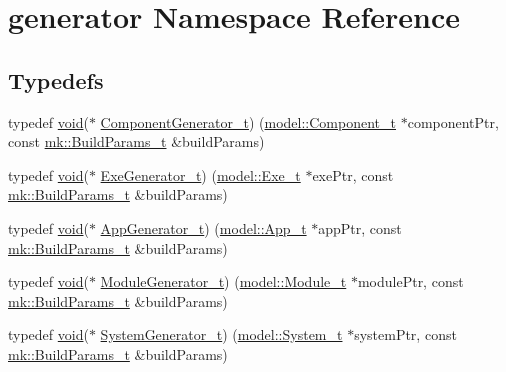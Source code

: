 \hypertarget{namespacegenerator}{}\section{generator Namespace Reference}
\label{namespacegenerator}
\subsection*{Typedefs}
\begin{DoxyCompactItemize}
\item 
typedef \hyperlink{_t_e_m_p_l_a_t_e__cdef_8h_ac9c84fa68bbad002983e35ce3663c686}{void}($\ast$ \hyperlink{namespacegenerator_a51a9c405b080b56f182d2a9324a9325d}{Component\+Generator\+\_\+t}) (\hyperlink{structmodel_1_1_component__t}{model\+::\+Component\+\_\+t} $\ast$component\+Ptr, const \hyperlink{structmk_1_1_build_params__t}{mk\+::\+Build\+Params\+\_\+t} \&build\+Params)
\item 
typedef \hyperlink{_t_e_m_p_l_a_t_e__cdef_8h_ac9c84fa68bbad002983e35ce3663c686}{void}($\ast$ \hyperlink{namespacegenerator_a8cae660bbcd34ce61bd0d4e2d526dac0}{Exe\+Generator\+\_\+t}) (\hyperlink{structmodel_1_1_exe__t}{model\+::\+Exe\+\_\+t} $\ast$exe\+Ptr, const \hyperlink{structmk_1_1_build_params__t}{mk\+::\+Build\+Params\+\_\+t} \&build\+Params)
\item 
typedef \hyperlink{_t_e_m_p_l_a_t_e__cdef_8h_ac9c84fa68bbad002983e35ce3663c686}{void}($\ast$ \hyperlink{namespacegenerator_a0dab6a94633151cc90073170ce71a25c}{App\+Generator\+\_\+t}) (\hyperlink{structmodel_1_1_app__t}{model\+::\+App\+\_\+t} $\ast$app\+Ptr, const \hyperlink{structmk_1_1_build_params__t}{mk\+::\+Build\+Params\+\_\+t} \&build\+Params)
\item 
typedef \hyperlink{_t_e_m_p_l_a_t_e__cdef_8h_ac9c84fa68bbad002983e35ce3663c686}{void}($\ast$ \hyperlink{namespacegenerator_a969256f0961bca1b4561e72ab10bae5c}{Module\+Generator\+\_\+t}) (\hyperlink{structmodel_1_1_module__t}{model\+::\+Module\+\_\+t} $\ast$module\+Ptr, const \hyperlink{structmk_1_1_build_params__t}{mk\+::\+Build\+Params\+\_\+t} \&build\+Params)
\item 
typedef \hyperlink{_t_e_m_p_l_a_t_e__cdef_8h_ac9c84fa68bbad002983e35ce3663c686}{void}($\ast$ \hyperlink{namespacegenerator_a57c2445f43a6255b255135d93e180de5}{System\+Generator\+\_\+t}) (\hyperlink{structmodel_1_1_system__t}{model\+::\+System\+\_\+t} $\ast$system\+Ptr, const \hyperlink{structmk_1_1_build_params__t}{mk\+::\+Build\+Params\+\_\+t} \&build\+Params)
\end{DoxyCompactItemize}
